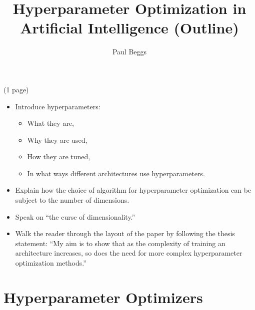 \documentclass[stu,12pt,floatsintext]{apa7}
\title{Hyperparameter Optimization in Artificial Intelligence (Outline)}
\author{Paul Beggs}
\affiliation{Hendrix College}
\begin{document}
\maketitle

\renewcommand{\labelenumi}{\theenumi.}
(1 page)
\begin{itemize}
    \item Introduce hyperparameters:
    \begin{itemize}
        \item What they are,
        \item Why they are used,
        \item How they are tuned,
        \item In what ways different architectures use hyperparameters.
    \end{itemize}
    \item Explain how the choice of algorithm for hyperparameter optimization can be subject to the number of dimensions. 
    \item Speak on ``the curse of dimensionality.''
    \item Walk the reader through the layout of the paper by following the thesis statement: ``My aim is to show that as the complexity of training an architecture increases, so does the need for more complex hyperparameter optimization methods.''
\end{itemize}

\section{Hyperparameter Optimizers}
\end{document}

